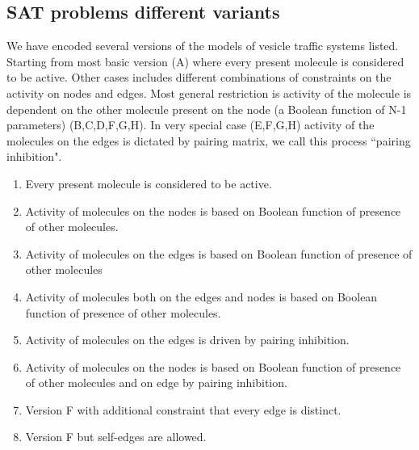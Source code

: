 \subsection{SAT problems different variants}

We have encoded several versions of the models of vesicle traffic systems listed. Starting from most basic version (A) where every present molecule is considered to be active. Other cases includes different combinations of constraints on the activity on nodes and edges. Most general restriction is activity of the molecule is dependent on the other molecule present on the node (a Boolean function of N-1 parameters) (B,C,D,F,G,H). In very special case (E,F,G,H) activity of the molecules on the edges is dictated by pairing matrix, we call this process ``pairing inhibition".


\begin{enumerate}[label=\Alph*]
\item Every present molecule is considered to be active.
\item Activity of molecules on the nodes is based on Boolean function of presence of other molecules. 
\item Activity of molecules on the edges is based on Boolean function of presence of other molecules
\item Activity of molecules both on the edges and nodes is based on Boolean function of presence of other molecules.
\item Activity of molecules on the edges is driven by pairing inhibition.
\item Activity of molecules on the nodes is based on Boolean function of presence of other molecules and on edge by pairing inhibition.
\item Version F with additional constraint that every edge is distinct.
\item Version F but self-edges are allowed.
\end{enumerate}
%

